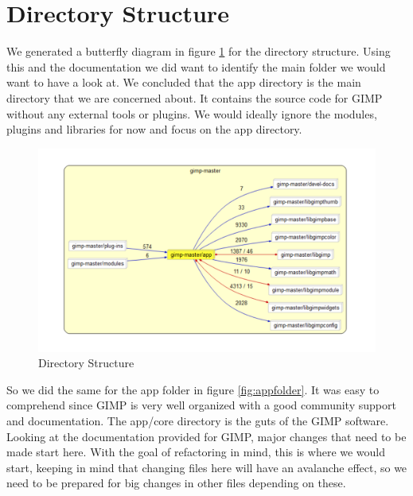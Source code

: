 \section{Directory Structure}
We generated a butterfly diagram in figure \ref{fig:direc} for the directory structure. Using this and the documentation we did want to identify the main folder we would want to have a look at. We concluded that the app directory is the main directory that we are concerned about. It contains the source code for GIMP without any external tools or plugins. We would ideally ignore the modules, plugins and libraries for now and focus on the app directory. 
\begin{figure}
\centering
\includegraphics[width=1\textwidth]{directorybutterfly.png}
\caption{\label{fig:direc}Directory Structure}
\end{figure}
So we did the same for the app folder in figure \ref{fig:appfolder}. It was easy to comprehend since GIMP is very well organized with a good community support and documentation. The app/core directory is the guts of the GIMP software. Looking at the documentation provided for GIMP, major changes that need to be made start here. With the goal of refactoring in mind, this is where we would start, keeping in mind that changing files here will have an avalanche effect, so we need to be prepared for big changes in other files depending on these.
